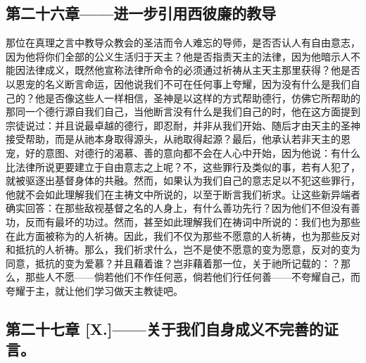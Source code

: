
\subsection{第二十六章——进一步引用西彼廉的教导}

那位在真理之言中教导众教会的圣洁而令人难忘的导师，是否否认人有自由意志，因为他将你们全部的公义生活归于天主？他是否指责天主的法律，因为他暗示人不能因法律成义，既然他宣称法律所命令的必须通过祈祷从主天主那里获得？他是否以恩宠的名义断言命运，因他说我们不可在任何事上夸耀，因为没有什么是我们自己的？他是否像这些人一样相信，圣神是以这样的方式帮助德行，仿佛它所帮助的那同一个德行源自我们自己，当他断言没有什么是我们自己的时，他在这方面提到宗徒说过：并且说最卓越的德行，即忍耐，并非从我们开始、随后才由天主的圣神接受帮助，而是从祂本身取得源头，从祂取得起源？最后，他承认若非天主的恩宠，好的意图、对德行的渴慕、善的意向都不会在人心中开始，因为他说：有什么比法律所说更要建立于自由意志之上呢？不，这些罪行及类似的事，若有人犯了，就被驱逐出基督身体的共融。然而，如果认为我们自己的意志足以不犯这些罪行，他就不会如此理解我们在主祷文中所说的，以至于断言我们祈求。让这些新异端者确实回答：在那些敌视基督之名的人身上，有什么善功先行？因为他们不但没有善功，反而有最坏的功过。然而，甚至如此理解我们在祷词中所说的：我们也为那些在此方面被称为的人祈祷。因此，我们不仅为那些不愿意的人祈祷，也为那些反对和抵抗的人祈祷。那么，我们祈求什么，岂不是使不愿意的变为愿意，反对的变为同意，抵抗的变为爱慕？并且藉着谁？岂非藉着那一位，关于祂所记载的：？那么，那些人不愿——倘若他们不作任何恶，倘若他们行任何善——不夸耀自己，而夸耀于主，就让他们学习做天主教徒吧。\par


\subsection{第二十七章 [X.]——关于我们自身成义不完善的证言。}

